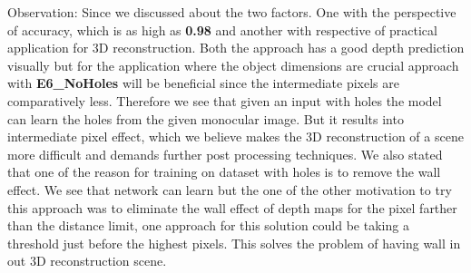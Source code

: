 Observation: Since we discussed about the two factors. One with the perspective of accuracy, which is as high as \textbf{0.98} and another with respective of practical application for 3D reconstruction. Both the approach has a good depth prediction visually but for the application where the object dimensions are crucial approach with \textbf{E6\_NoHoles} will be beneficial since the intermediate pixels are comparatively less. 
Therefore we see that given an input with holes the model can learn the holes from the given monocular image. But it results into intermediate pixel effect, which we believe makes the 3D reconstruction of a scene more difficult and demands further post processing techniques. We also stated that one of the reason for training on dataset with holes is to remove the wall effect. We see that network can learn but the one of the other motivation to try this approach was to eliminate the wall effect of depth maps  for the pixel farther than the distance limit, one approach for this solution could be taking a threshold just before the highest pixels. This solves the problem of having wall in out 3D reconstruction scene.\\


